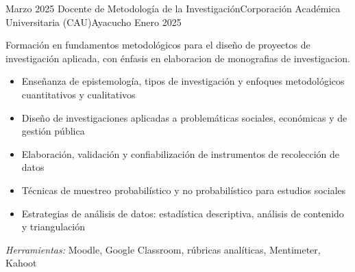 \experience
{Marzo 2025} {Docente de Metodología de la Investigación}{Corporación Académica Universitaria (CAU)}{Ayacucho}
{Enero 2025} {
	Formación en fundamentos metodológicos para el diseño de proyectos de investigación aplicada, con énfasis en elaboracion de monografias de investigacion.
	\begin{itemize}
		\item Enseñanza de epistemología, tipos de investigación y enfoques metodológicos cuantitativos y cualitativos
		\item Diseño de investigaciones aplicadas a problemáticas sociales, económicas y de gestión pública
		\item Elaboración, validación y confiabilización de instrumentos de recolección de datos
		\item Técnicas de muestreo probabilístico y no probabilístico para estudios sociales
		\item Estrategias de análisis de datos: estadística descriptiva, análisis de contenido y triangulación
	\end{itemize}
}
{\footnotesize{\emph{Herramientas:} Moodle, Google Classroom, rúbricas analíticas, Mentimeter, Kahoot}}
